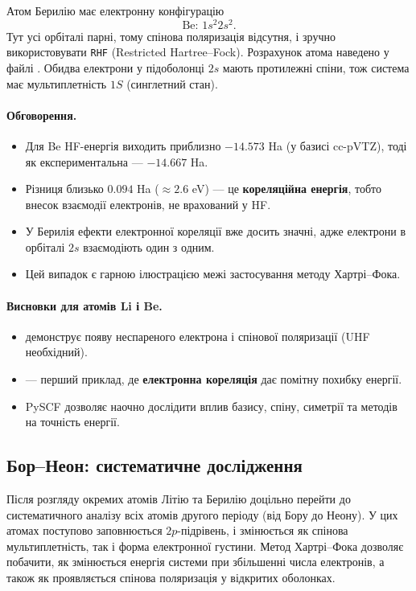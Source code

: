 Атом Берилію має електронну конфігурацію
\[
\text{Be: } 1s^2 2s^2.
\]
Тут усі орбіталі парні, тому спінова поляризація відсутня, і зручно використовувати \texttt{RHF} (Restricted Hart\-ree–Fock). Розрахунок атома наведено у файлі .
Обидва електрони у підоболонці \(2s\) мають протилежні спіни, тож система має мультиплетність \(1S\) (синглетний стан).

\paragraph{Обговорення.}
\begin{itemize}
  \item Для Be HF-енергія виходить приблизно \(-14.573\) Ha (у базисі cc-pVTZ), тоді як експериментальна --- \(-14.667\) Ha.
  \item Різниця близько \(0.094\) Ha (\(\approx 2.6\) eV) --- це \textbf{кореляційна енергія}, тобто внесок взаємодії електронів, не врахований у HF.
  \item У Берилія ефекти електронної кореляції вже досить значні, адже електрони в орбіталі \(2s\) взаємодіють один з одним.
  \item Цей випадок є гарною ілюстрацією межі застосування методу Хартрі–Фока.
\end{itemize}

\paragraph{Висновки для атомів Li і Be.}
\begin{itemize}
  \item {} демонструє появу неспареного електрона і спінової поляризації (UHF необхідний).
  \item {} --- перший приклад, де \textbf{електронна кореляція} дає помітну похибку енергії.
  \item PySCF дозволяє наочно дослідити вплив базису, спіну, симетрії та методів на точність енергії.
\end{itemize}


\subsection{Бор--Неон: систематичне дослідження}

Після розгляду окремих атомів Літію та Берилію доцільно перейти до систематичного аналізу всіх атомів другого періоду (від Бору до Неону).
У цих атомах поступово заповнюється \(2p\)-підрівень, і змінюється як спінова мультиплетність, так і форма електронної густини.
Метод Хартрі–Фока дозволяє побачити, як змінюється енергія системи при збільшенні числа електронів, а також як проявляється спінова поляризація у відкритих оболонках.


